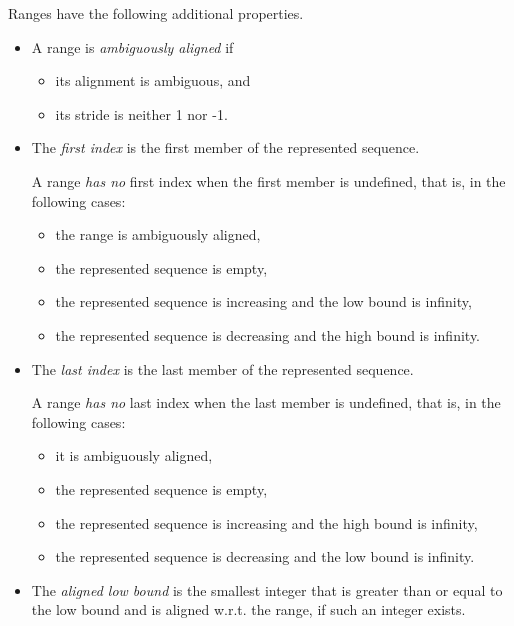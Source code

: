Ranges have the following additional properties.
\begin{itemize}

\item A range is \emph{ambiguously aligned} if
  \begin{itemize}
  \item its alignment is ambiguous, and
  \item its stride is neither 1 nor -1.
  \end{itemize}

\item The \emph{first index} is the first member of the represented sequence.

  A range \emph{has no} first index when the first member is undefined,
  that is, in the following cases:
  \begin{itemize}
  \item the range is ambiguously aligned,
  \item the represented sequence is empty,
  \item the represented sequence is increasing and the low bound is infinity,
  \item the represented sequence is decreasing and the high bound is infinity.
  \end{itemize}

\item The \emph{last index} is the last member of the represented sequence.

  A range \emph{has no} last index when the last member is undefined,
  that is, in the following cases:
  \begin{itemize}
  \item it is ambiguously aligned,
  \item the represented sequence is empty,
  \item the represented sequence is increasing and the high bound is infinity,
  \item the represented sequence is decreasing and the low bound is infinity.
  \end{itemize}

\item The \emph{aligned low bound} is the smallest integer that is
  greater than or equal to the low bound and is aligned w.r.t. the range,
  if such an integer exists.


\end{itemize}
